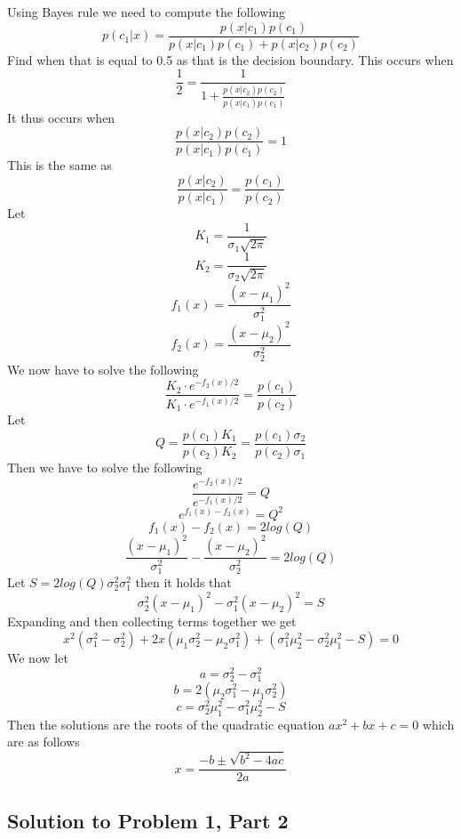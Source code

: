 \documentclass[11pt,psfig]{article}
\begin{document}
Using Bayes rule we need to compute the following
\[
p(c_1|x) = \frac{p(x|c_1)p(c_1)}{p(x|c_1)p(c_1) + p(x|c_2)p(c_2)}
\]
Find when that is equal to 0.5 as that is the decision boundary. This occurs when
\[
\frac{1}{2} = \frac{1}{1 + \frac{p(x|c_2)p(c_2)}{p(x|c_1)p(c_1)}}
\]
It thus occurs when
\[
\frac{p(x|c_2)p(c_2)}{p(x|c_1)p(c_1)} = 1
\]
This is the same as
\[
\frac{p(x|c_2)}{p(x|c_1)} = \frac{p(c_1)}{p(c_2)}
\]
Let
\[
K_1 = \frac{1}{\sigma_1 \sqrt{2\pi}}
\]
\[
K_2 = \frac{1}{\sigma_2 \sqrt{2\pi}}
\]
\[
f_1(x) = \frac{(x-\mu_1)^2}{\sigma_1^2}
\]
\[
f_2(x) = \frac{(x-\mu_2)^2}{\sigma_2^2}
\]
We now have to solve the following
\[
\frac{K_2 \cdot e^{-f_2(x)/2}}{K_1 \cdot e^{-f_1(x)/2}} = \frac{p(c_1)}{p(c_2)}
\]
Let
\[
Q = \frac{p(c_1)K_1}{p(c_2)K_2} = \frac{p(c_1)\sigma_2}{p(c_2)\sigma_1}
\]
Then we have to solve the following
\[
\frac{e^{-f_2(x)/2}}{e^{-f_1(x)/2}} = Q
\]
\[
e^{f_1(x) - f_2(x)} = Q^2
\]
\[
f_1(x) - f_2(x) = 2 log(Q)
\]
\[
\frac{(x-\mu_1)^2}{\sigma_1^2} - \frac{(x-\mu_2)^2}{\sigma_2^2} = 2 log(Q)
\]
Let $S = 2 log(Q) \sigma_2^2 \sigma_1^2$ then it holds that
\[
\sigma_2^2(x-\mu_1)^2 - \sigma_1^2(x-\mu_2)^2 = S
\]
Expanding and then collecting terms together we get
\[
x^2(\sigma_1^2 - \sigma_2^2) + 2x(\mu_1 \sigma_2^2 - \mu_2 \sigma_1^2) + (\sigma_1^2 \mu_2^2 - \sigma_2^2 \mu_1^2 - S) = 0
\]
We now let
\[
a = \sigma_2^2 - \sigma_1^2
\]
\[
b = 2(\mu_2 \sigma_1^2 - \mu_1 \sigma_2^2)
\]
\[
c = \sigma_2^2 \mu_1^2 - \sigma_1^2 \mu_2^2 - S
\]
Then the solutions are the roots of the quadratic equation $ax^2 + bx + c = 0$ which are as follows
\[
x = \frac{-b \pm \sqrt{b^2 - 4ac}}{2a}
\]

\subsection*{Solution to Problem 1, Part 2}
\end{document}
